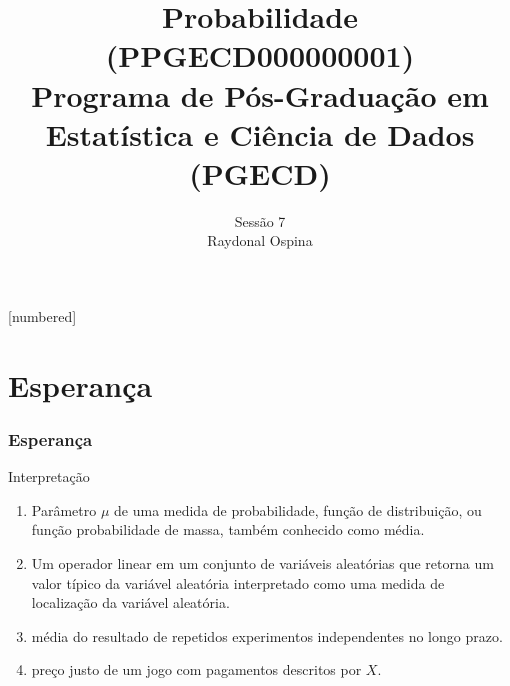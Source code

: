 


[numbered]



\hypersetup{colorlinks,linkcolor=,urlcolor=links}


\graphicspath{{./graphics/}} 			%

\newcommand{\cor}[1]{ \{{#1}\}}


\title[Probabilidade]{  Probabilidade (PPGECD000000001) \\ \vspace{1cm}Programa de Pós-Graduação em Estatística e Ciência de Dados (PGECD) }
\author[ Raydonal Ospina 
\ ]{
	Sessão 7 \\
	${}$ \\
	Raydonal Ospina  }

\date[]{}








\begin{frame}
  \titlepage
\end{frame}



\section{Esperança}
\begin{frame}
\frametitle{Esperança}
	\begin{block}{Interpretação}
	\begin{enumerate}
		\item Parâmetro $\mu$ de uma medida de probabilidade, função de distribuição, ou função probabilidade de massa, também conhecido como média.
		\item Um operador linear em um conjunto de variáveis aleatórias que
		retorna um valor típico da variável aleatória interpretado como uma
		medida de localização da variável aleatória.
		\item média do resultado de repetidos experimentos independentes no longo prazo.
		\item preço justo de um jogo com pagamentos descritos por $X$.
	\end{enumerate}
\end{block}
\end{frame}

